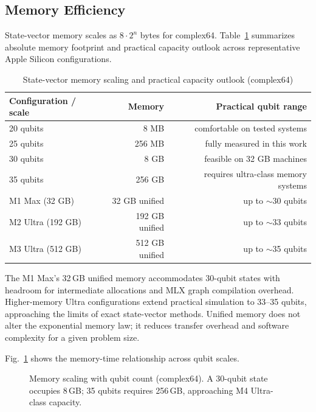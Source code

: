 \documentclass[runningheads]{llncs}
\begin{document}
\subsection{Memory Efficiency}

State-vector memory scales as $8 \cdot 2^n$ bytes for complex64. Table~\ref{tab:memory-capacity} summarizes absolute memory footprint and practical capacity outlook across representative Apple Silicon configurations.

\begin{table}[t]
\caption{State-vector memory scaling and practical capacity outlook (complex64)}
\label{tab:memory-capacity}
\centering
\begin{tabular}{lrr}
\toprule
Configuration / scale & Memory & Practical qubit range \\
\midrule
20 qubits & 8 MB & comfortable on tested systems \\
25 qubits & 256 MB & fully measured in this work \\
30 qubits & 8 GB & feasible on 32 GB machines \\
35 qubits & 256 GB & requires ultra-class memory systems \\
\midrule
M1 Max (32 GB) & 32 GB unified & up to $\sim$30 qubits \\
M2 Ultra (192 GB) & 192 GB unified & up to $\sim$33 qubits \\
M3 Ultra (512 GB) & 512 GB unified & up to $\sim$35 qubits \\
\bottomrule
\end{tabular}
\end{table}

The M1 Max's 32\,GB unified memory accommodates 30-qubit states with headroom for intermediate allocations and MLX graph compilation overhead. Higher-memory Ultra configurations extend practical simulation to 33--35 qubits, approaching the limits of exact state-vector methods. Unified memory does not alter the exponential memory law; it reduces transfer overhead and software complexity for a given problem size.

Fig.~\ref{fig:memory-scaling} shows the memory-time relationship across qubit scales.

\begin{figure}[t]
\centering
{}
\caption{Memory scaling with qubit count (complex64). A 30-qubit state occupies 8\,GB; 35 qubits requires 256\,GB, approaching M4 Ultra-class capacity.}
\label{fig:memory-scaling}
\end{figure}
\end{document}
